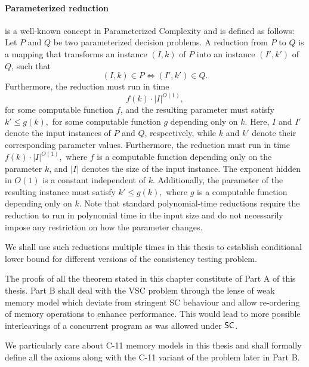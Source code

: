 \paragraph*{Parameterized reduction}   is a well-known concept in Parameterized Complexity  \cite{FlumGrohe2006,DowneyFellows2013} and is defined as follows: Let $P$ and $Q$ be two
parameterized decision problems. A  reduction from $P$ to $Q$ is
a mapping that transforms an instance $(I,k)$ of $P$ into an instance
$(I',k')$ of $Q$, such that
\[
(I,k) \in P \iff (I',k') \in Q.
\]
Furthermore, the reduction must run in time
\[
f(k)\cdot |I|^{O(1)},
\]
for some computable function $f$, and the resulting parameter must
satisfy $k' \leq g(k),$ for some computable function $g$ depending only on $k$. Here, $I$ and $I'$ denote the input instances of $P$ and $Q$, respectively, while $k$ and $k'$ denote their corresponding
parameter values. Furthermore, the reduction must run in time $f(k)\cdot |I|^{O(1)},$ where $f$ is a computable function depending only on the parameter $k$, and $|I|$ denotes the size of the input instance.
The exponent hidden in $O(1)$ is a constant independent of $k$. Additionally, the parameter of the resulting instance must satisfy $ k' \leq g(k),$ where $g$ is a computable function depending only on $k$. Note that standard polynomial-time reductions require the reduction to run in polynomial time in the input size and do not necessarily impose any restriction on how the parameter changes. 

We shall use such reductions multiple times in this thesis to establish conditional lower bound for different versions of the consistency testing problem. 

\smallskip

The proofs of all the theorem stated in this chapter constitute of Part A of this thesis.
Part B shall deal with the VSC problem through the lense of weak memory model which deviate from stringent SC behaviour and allow re-ordering of memory operations to enhance performance. This would lead to more possible interleavings of a concurrent program as was allowed under $\mathsf{SC}$.

We particularly care about C-11  memory models in this thesis and shall formally define all the axioms along with the C-11 variant of the problem later in Part B. 



